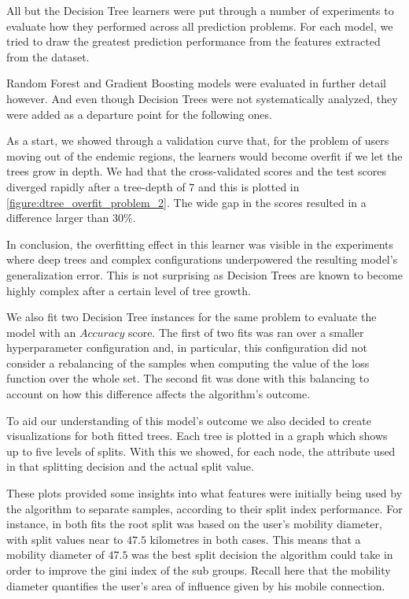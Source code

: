 All but the Decision Tree learners were put through a number of experiments to evaluate how they performed across all prediction problems.
For each model, we tried to draw the greatest prediction performance from the features extracted from the dataset.

Random Forest and Gradient Boosting models were evaluated in further detail however.
And even though Decision Trees were not systematically analyzed, they were added as a departure point for the following ones.

As a start, we showed through a validation curve that, for the problem of users moving out of the endemic regions, the learners would become overfit if we let the trees grow in depth.
We had that the cross-validated scores and the test scores diverged rapidly after a tree-depth of $7$ and this is plotted in \cref{figure:dtree_overfit_problem_2}.
The wide gap in the scores resulted in a difference larger than $30\%$.

In conclusion, the overfitting effect in this learner was visible in the experiments where deep trees and complex configurations underpowered the resulting model's generalization error.
This is not surprising as Decision Trees are known to become highly complex after a certain level of tree growth.


We also fit two Decision Tree instances for the same problem to evaluate the model with an $Accuracy$ score.
The first of two fits was ran over a smaller hyperparameter configuration and, in particular, this configuration did not consider a rebalancing of the samples when computing the value of the loss function over the whole set.
The second fit was done with this balancing to account on how this difference affects the algorithm's outcome.

To aid our understanding of this model's outcome we also decided to create visualizations for both fitted trees.
Each tree is plotted in a graph which shows up to five levels of splits.
With this we showed, for each node, the attribute used in that splitting decision and the actual split value.

These plots provided some insights into what features were initially being used by the algorithm to separate samples, according to their split index performance.
For instance, in both fits the root split was based on the user's mobility diameter, with split values near to $47.5$ kilometres in both cases.
This means that a mobility diameter of $47.5$ was the best split decision the algorithm could take in order to improve the gini index of the sub groups.
Recall here that the mobility diameter quantifies the user's area of influence given by his mobile connection.

